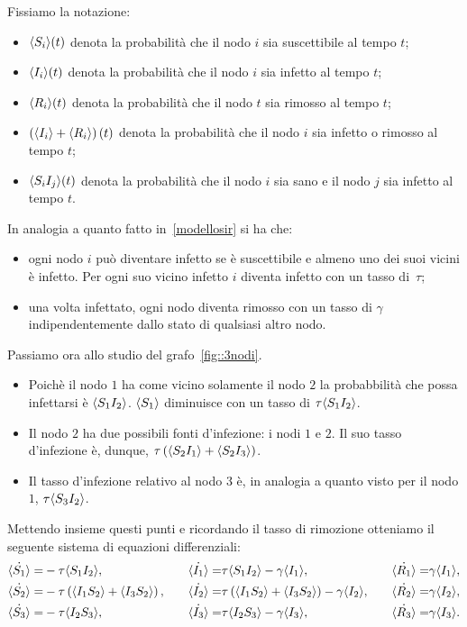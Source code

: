 Fissiamo la notazione:
\begin{itemize}
	\item  $\langle S_i \rangle(t)$  denota la probabilit\`a che il nodo $i$ sia suscettibile al tempo $t$;
	\item   $\langle I_i \rangle(t)$  denota la probabilit\`a che il nodo $i$ sia infetto al tempo $t$;
	\item  $\langle R_i \rangle(t)$  denota la probabilit\`a che il nodo $t$ sia rimosso al tempo $t$;
	\item $\left(  \langle  I_i \rangle+ \langle  R_i \rangle \right)(t)$ denota la probabilit\`a che il nodo $i$ sia infetto o rimosso al tempo $t$;
	\item $\langle S_iI_j \rangle(t)$ denota la probabilit\`a che il nodo $i$ sia sano e il nodo $j$ sia infetto al tempo $t$.
	\end{itemize}
In analogia a quanto fatto in~\ref{modellosir} si ha che:
\begin{itemize}
	\item ogni nodo $i$ pu\`o diventare infetto se \`e suscettibile e almeno uno dei suoi vicini \`e infetto. Per ogni suo vicino infetto $i$ diventa infetto con un tasso di~$\tau$;
	\item una volta infettato, ogni nodo diventa rimosso con un tasso di $\gamma$ indipendentemente dallo stato di qualsiasi altro nodo.
\end{itemize}
\newpage
Passiamo ora allo studio del grafo~\ref{fig::3nodi}.
\begin{itemize}
	

\item Poich\`e il nodo $1$ ha come vicino solamente il nodo $2$ la probabbilit\`a che possa infettarsi \`e $\langle S_1 I_2 \rangle $. $\langle S_1 \rangle$ diminuisce con un tasso di $\tau \langle S_1 I_2 \rangle$.
\item Il nodo $2$ ha due possibili fonti d'infezione: i nodi $1$ e $2$. Il suo tasso d'infezione \`e, dunque,  $\tau \left(  \langle S_2I_1 \rangle + \langle S_2 I_3 \rangle \right)$.
\item Il tasso d'infezione relativo al nodo $3$ \`e,  
in analogia a quanto visto per il nodo $1$, $\tau\langle S_3I_2 \rangle$.
\end{itemize}
Mettendo insieme questi punti e ricordando il tasso di rimozione otteniamo il seguente sistema di equazioni differenziali:
\begin{equation*}
\begin{aligned}
	\dot{\langle S_1 \rangle} = & -\tau \langle  S_1 I_2 \rangle, 
\quad &
	\dot{\langle I_1 \rangle} = & \tau \langle S_1 I_2 \rangle-\gamma \langle I_1 \rangle, 
\quad & 
	\dot{\langle R_1 \rangle} = & \gamma \langle  I_1 \rangle,
\\
	\dot{\langle S_2 \rangle} = & -\tau \left(  \langle  I_1 S_2 \rangle + \langle I_3S_2 \rangle \right),	
\quad & 
	\dot{\langle I_2 \rangle} = & \tau \left(  \langle  I_1 S_2 \rangle + \langle I_3S_2 \rangle \right)-\gamma \langle I_2 \rangle,
\quad & 
	\dot{\langle R_2 \rangle} = & \gamma \langle  I_2 \rangle,
\\
	\dot{\langle S_3 \rangle} = & -\tau \langle  I_2 S_3 \rangle,
\quad & 
	\dot{\langle I_3 \rangle} = & \tau \langle  I_2 S_3 \rangle-\gamma \langle I_3 \rangle,
\quad & 
 	\dot{\langle R_3 \rangle} = & \gamma \langle  I_3 \rangle.
\end{aligned}
\end{equation*}
